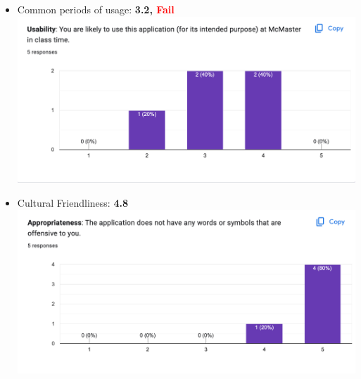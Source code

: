 \documentclass[12pt, titlepage]{article}
\begin{document}
\begin{itemize}
\item Common periods of usage: \textbf{3.2, \textcolor{red}{Fail}}\\
\includegraphics[scale=0.4]{Q4.png}
\item Cultural Friendliness: \textbf{4.8}\\
\includegraphics[scale=0.4]{Q5.png}
\end{itemize}
\end{document}
